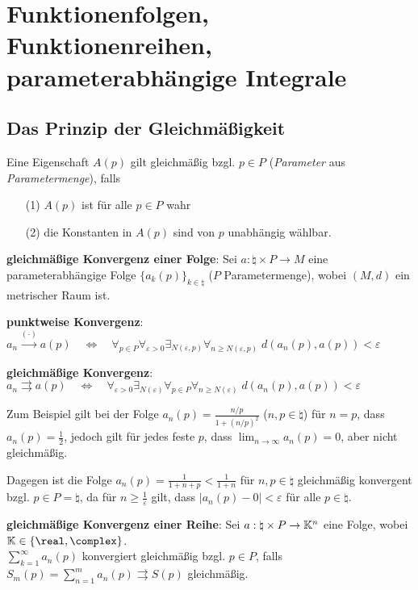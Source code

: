 \section{%
    Funktionenfolgen, Funktionenreihen, parameterabhängige Integrale%
}

\subsection{%
    Das Prinzip der Gleichmäßigkeit%
}

Eine Eigenschaft $A(p)$ gilt gleichmäßig bzgl. $p \in P$
(\emph{Parameter} aus \emph{Parametermenge}), falls
\begin{enumerate}
    \item[(1)] $A(p)$ ist für alle $p \in P$ wahr
    \item[(2)] die Konstanten in $A(p)$ sind von $p$ unabhängig wählbar.
\end{enumerate}

\linie

\textbf{gleichmäßige Konvergenz einer Folge}:
Sei $a: \natural \times P \rightarrow M$ eine parameterabhängige Folge
$\{a_k(p)\}_{k \in \natural}$ ($P$ Parametermenge),
wobei $(M,d)$ ein metrischer Raum ist.

\textbf{punktweise Konvergenz}: $a_n \xrightarrow{(\cdot)} a(p)
\quad\Leftrightarrow\quad \forall_{p \in P} \forall_{\varepsilon > 0}
\exists_{N(\varepsilon, p)} \forall_{n \ge N(\varepsilon, p)}\;
d(a_n(p), a(p)) < \varepsilon$

\textbf{gleichmäßige Konvergenz}: $a_n \rightrightarrows a(p)
\quad\Leftrightarrow\quad \forall_{\varepsilon > 0} \exists_{N(\varepsilon)}
\forall_{p \in P} \forall_{n \ge N(\varepsilon)}\;
d(a_n(p), a(p)) < \varepsilon$

Zum Beispiel gilt bei der Folge $a_n(p) = \frac{n/p}{1 + (n / p)^2}$
($n, p \in \natural$) für $n = p$, dass $a_n(p) = \frac{1}{2}$,
jedoch gilt für jedes feste $p$, dass $\lim_{n \to \infty} a_n(p) = 0$,
aber nicht gleichmäßig.

Dagegen ist die Folge $a_n(p) = \frac{1}{1 + n + p} < \frac{1}{1 + n}$
für $n, p \in \natural$ gleichmäßig konvergent bzgl. $p \in P = \natural$,
da für $n \ge \frac{1}{\varepsilon}$ gilt, dass
$|a_n(p) - 0| < \varepsilon$ für alle $p \in \natural$.

\linie

\textbf{gleichmäßige Konvergenz einer Reihe}:
Sei $a: \natural \times P \rightarrow \mathbb{K}^n$ eine Folge,
wobei $\field \in \{\real, \complex\}$. \\
$\sum_{k=1}^\infty a_n(p)$ konvergiert gleichmäßig bzgl. $p \in P$,
falls $S_m(p) = \sum_{n=1}^m a_n(p) \rightrightarrows S(p)$ gleichmäßig.

